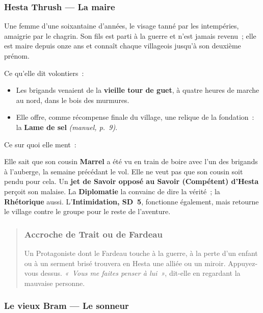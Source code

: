 \documentclass[10pt,a4paper]{article}
\newcommand{\tightlist}{\setlength{\itemsep}{0pt}\setlength{\parskip}{0pt}}
\begin{document}
\subsubsection{Hesta Thrush --- La maire}\label{hesta-thrush-la-maire}

Une femme d’une soixantaine d’années, le visage tanné par les intempéries, amaigrie par le chagrin. Son fils est parti à la guerre et n’est jamais revenu~; elle est maire depuis onze ans et connaît chaque villageois jusqu’à son deuxième prénom.

Ce qu’elle dit volontiers~:

\begin{itemize}
\tightlist
\item
  Les brigands venaient de la \textbf{vieille tour de guet}, à quatre heures de marche au nord, dans le bois des murmures.
\item
  Elle offre, comme récompense finale du village, une relique de la fondation~: la \textbf{Lame de sel} \emph{(manuel, p.~9)}.
\end{itemize}

Ce sur quoi elle ment~:

Elle sait que son cousin \textbf{Marrel} a été vu en train de boire avec l’un des brigands à l’auberge, la semaine précédant le vol. Elle ne veut pas que son cousin soit pendu pour cela. Un \textbf{jet de Savoir opposé au Savoir (Compétent) d’Hesta} perçoit son malaise. La \textbf{Diplomatie} la convainc de dire la vérité~; la \textbf{Rhétorique} aussi. L’\textbf{Intimidation, SD~5}, fonctionne également, mais retourne le village contre le groupe pour le reste de l’aventure.

\begin{quote}
\subsubsection{Accroche de Trait ou de Fardeau}\label{accroche-de-trait-ou-de-fardeau}

Un Protagoniste dont le Fardeau touche à la guerre, à la perte d’un enfant ou à un serment brisé trouvera en Hesta une alliée ou un miroir. Appuyez-vous dessus. \emph{«~Vous me faites penser à lui~»}, dit-elle en regardant la mauvaise personne.
\end{quote}

\subsubsection{Le vieux Bram --- Le sonneur}\label{le-vieux-bram-le-sonneur}
\end{document}
